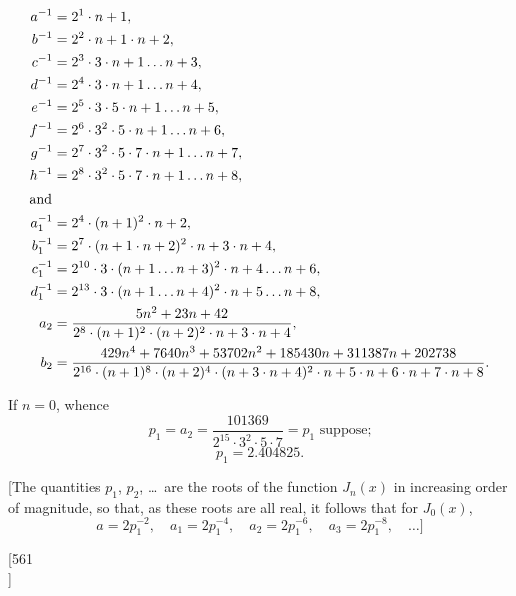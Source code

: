 \documentclass[12pt,a4paper]{article}
\theoremstyle{plain}
\theoremstyle{definition}
\begin{document}
\begin{align*}
a^{-1} &= 2^1 \cdot n + 1,\\
b^{-1} &= 2^2 \cdot n + 1 \cdot n + 2,\\
c^{-1} &= 2^3 \cdot 3 \cdot n + 1 \ldots n + 3,\\
d^{-1} &= 2^4 \cdot 3 \cdot n + 1 \ldots n + 4,\\
e^{-1} &= 2^5 \cdot 3 \cdot 5 \cdot n + 1 \ldots n + 5,\\
f^{-1} &= 2^6 \cdot 3^2 \cdot 5 \cdot n + 1 \ldots n + 6,\\
g^{-1} &= 2^7 \cdot 3^2 \cdot 5 \cdot 7 \cdot n + 1 \ldots n + 7,\\
h^{-1} &= 2^8 \cdot 3^2 \cdot 5 \cdot 7 \cdot n + 1 \ldots n + 8,\\
\intertext{and}
a_1^{-1} &= 2^4 \cdot (n + 1)^2 \cdot n + 2,\\
b_1^{-1} &= 2^7 \cdot (n + 1 \cdot n + 2)^2 \cdot n + 3 \cdot n + 4,\\
c_1^{-1} &= 2^{10} \cdot 3 \cdot (n + 1 \ldots n + 3)^2 \cdot n + 4 \ldots n + 6,\\
d_1^{-1} &= 2^{13} \cdot 3 \cdot (n + 1 \ldots n + 4)^2 \cdot n + 5 \ldots n + 8,\\
a_2 &= \frac{5n^2 + 23n + 42}{2^8 \cdot (n + 1)^2 \cdot (n + 2)^2 \cdot n + 3 \cdot n + 4},\\
b_2 &= \frac{429n^4 + 7640n^3 + 53702n^2 + 185430n + 311387n + 202738}{2^{16} \cdot (n + 1)^8 \cdot (n + 2)^4 \cdot (n + 3 \cdot n + 4)^2 \cdot n + 5 \cdot n + 6 \cdot n + 7 \cdot n + 8}.
\end{align*}

If $n = 0$, whence
\[
p_1 = a_2 = \frac{101369}{2^{15} \cdot 3^2 \cdot 5 \cdot 7} = p_1 \text{ suppose;}
\]
\[
p_1 = 2.404825.
\]

[The quantities $p_1$, $p_2$, \ldots\ are the roots of the function $J_n(x)$ in increasing order of magnitude, so that, as these roots are all real, it follows that for $J_0(x)$,
\[
a = 2p_1^{-2},\quad a_1 = 2p_1^{-4},\quad a_2 = 2p_1^{-6},\quad a_3 = 2p_1^{-8},\quad \ldots]
\]


\newpage
\setcounter{page}{21}

\begin{center}
[561\\
]
\end{center}
\end{document}
